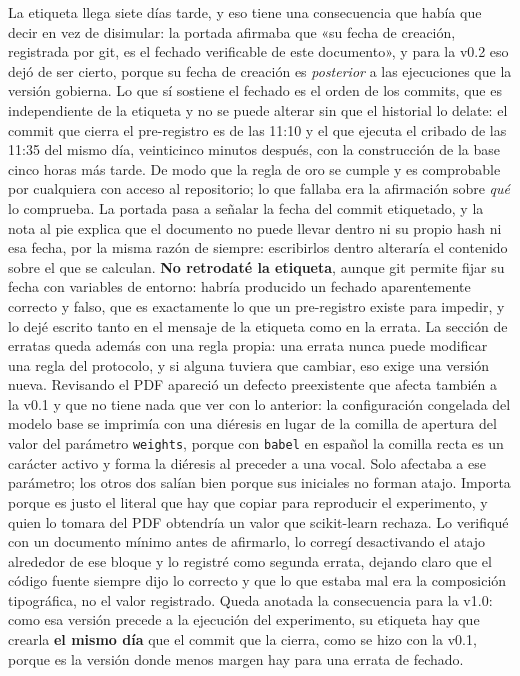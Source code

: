 \documentclass[11pt,letterpaper]{article}
\begin{document}
{La etiqueta llega siete días tarde, y eso tiene una consecuencia que había que decir en vez
 de disimular: la portada afirmaba que «su fecha de creación, registrada por git, es el
 fechado verificable de este documento», y para la v0.2 eso dejó de ser cierto, porque su
 fecha de creación es \emph{posterior} a las ejecuciones que la versión gobierna. Lo que sí
 sostiene el fechado es el orden de los commits, que es independiente de la etiqueta y no se
 puede alterar sin que el historial lo delate: el commit que cierra el pre-registro es de
 las 11:10 y el que ejecuta el cribado de las 11:35 del mismo día, veinticinco minutos
 después, con la construcción de la base cinco horas más tarde. De modo que la regla de oro
 se cumple y es comprobable por cualquiera con acceso al repositorio; lo que fallaba era la
 afirmación sobre \emph{qué} lo comprueba. La portada pasa a señalar la fecha del commit
 etiquetado, y la nota al pie explica que el documento no puede llevar dentro ni su propio
 hash ni esa fecha, por la misma razón de siempre: escribirlos dentro alteraría el contenido
 sobre el que se calculan. \textbf{No retrodaté la etiqueta}, aunque git permite fijar su
 fecha con variables de entorno: habría producido un fechado aparentemente correcto y falso,
 que es exactamente lo que un pre-registro existe para impedir, y lo dejé escrito tanto en
 el mensaje de la etiqueta como en la errata. La sección de erratas queda además con una
 regla propia: una errata nunca puede modificar una regla del protocolo, y si alguna tuviera
 que cambiar, eso exige una versión nueva. Revisando el PDF apareció un defecto preexistente
 que afecta también a la v0.1 y que no tiene nada que ver con lo anterior: la configuración
 congelada del modelo base se imprimía con una diéresis en lugar de la comilla de apertura
 del valor del parámetro \texttt{weights}, porque con \texttt{babel} en español la comilla
 recta es un carácter activo y forma la diéresis al preceder a una vocal. Solo afectaba a
 ese parámetro; los otros dos salían bien porque sus iniciales no forman atajo. Importa
 porque es justo el literal que hay que copiar para reproducir el experimento, y quien lo
 tomara del PDF obtendría un valor que scikit-learn rechaza. Lo verifiqué con un documento
 mínimo antes de afirmarlo, lo corregí desactivando el atajo alrededor de ese bloque y lo
 registré como segunda errata, dejando claro que el código fuente siempre dijo lo correcto y
 que lo que estaba mal era la composición tipográfica, no el valor registrado. Queda anotada
 la consecuencia para la v1.0: como esa versión precede a la ejecución del experimento, su
 etiqueta hay que crearla \textbf{el mismo día} que el commit que la cierra, como se hizo con
 la v0.1, porque es la versión donde menos margen hay para una errata de fechado.}
\end{document}
